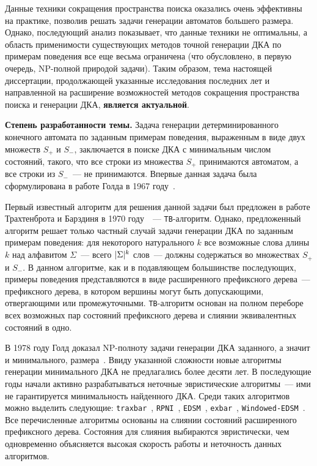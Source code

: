 Данные техники сокращения пространства поиска оказались очень эффективны на практике, позволив решать задачи генерации автоматов большего размера.
Однако, последующий анализ показывает, что данные техники не оптимальны, а область применимости существующих методов точной генерации ДКА по примерам поведения все еще весьма ограничена (что обусловлено, в первую очередь, NP-полной природой задачи).
Таким образом, тема настоящей диссертации, продолжающей указанные исследования последних лет и направленной на расширение возможностей методов сокращения пространства поиска и генерации ДКА, \textbf{является актуальной}.

\textbf{Степень разработанности темы.}
Задача генерации детерминированного конечного автомата по заданным примерам поведения, выраженным в виде двух множеств $S_{+}$ и $S_{-}$, заключается в поиске ДКА с минимальным числом состояний, такого, что все строки из множества $S_{+}$ принимаются автоматом, а все строки из $S_{-}$~--- не принимаются.
Впервые данная задача была сформулирована в работе Голда в 1967 году~\cite{DBLP:journals/iandc/Gold67}.

Первый известный алгоритм для решения данной задачи был предложен в работе Трахтенброта и Барздиня в 1970 году~\cite{trakhtenbrot-1973-modeling}~--- \texttt{TB}-алгоритм.
Однако, предложенный алгоритм решает только частный случай задачи генерации ДКА по заданным примерам поведения: для некоторого натурального $k$ все возможные слова длины $k$ над алфавитом $\Sigma$~--- всего $\lvert\Sigma\rvert^{k}$ слов~--- должны содержаться во множествах $S_{+}$ и $S_{-}$.
В данном алгоритме, как и в подавляющем большинстве последующих, примеры поведения представляются в виде расширенного префиксного дерева~--- префиксного дерева, в котором вершины могут быть допускающими, отвергающими или промежуточными.
\texttt{TB}-алгоритм основан на полном переборе всех возможных пар состояний префиксного дерева и слиянии эквивалентных состояний в одно.

В 1978 году Голд доказал NP-полноту задачи генерации ДКА заданного, а значит и минимального, размера~\cite{DBLP:journals/iandc/Gold78}.
Ввиду указанной сложности новые алгоритмы генерации минимального ДКА не предлагались более десяти лет.
В последующие годы начали активно разрабатываться неточные эвристические алгоритмы~--- ими не гарантируется минимальность найденного ДКА.
Среди таких алгоритмов можно выделить следующие: \texttt{traxbar}~\cite{DBLP:conf/colt/Lang92}, \texttt{RPNI}~\cite{oncina-rpni-1992}, \texttt{EDSM}~\cite{DBLP:conf/icgi/LangPP98}, \texttt{exbar}~\cite{lang-1999-faster}, \texttt{Windowed-EDSM}~\cite{DBLP:conf/icgi/CicchelloK02}.
Все перечисленные алгоритмы основаны на слиянии состояний расширенного префиксного дерева.
Состояния для слияния выбираются эвристически, чем одновременно объясняется высокая скорость работы и неточность данных алгоритмов.

